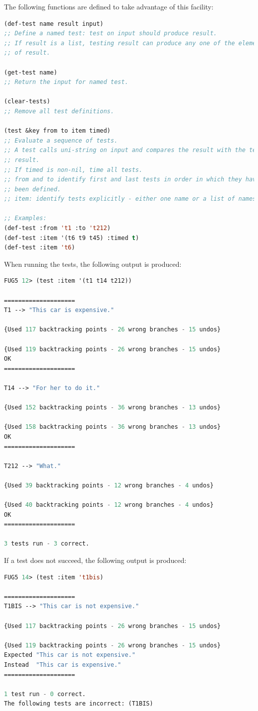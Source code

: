 \documentclass[10pt,a4paper]{report}
\begin{document}
The following functions are defined to take advantage of this facility:

\begin{lstlisting}[language=Lisp]
(def-test name result input) 
;; Define a named test: test on input should produce result. 
;; If result is a list, testing result can produce any one of the elements
;; of result.

(get-test name)
;; Return the input for named test.

(clear-tests)
;; Remove all test definitions.

(test &key from to item timed)
;; Evaluate a sequence of tests.
;; A test calls uni-string on input and compares the result with the test's
;; result. 
;; If timed is non-nil, time all tests.
;; from and to identify first and last tests in order in which they have
;; been defined.
;; item: identify tests explicitly - either one name or a list of names.

;; Examples:
(def-test :from 't1 :to 't212)
(def-test :item '(t6 t9 t45) :timed t)
(def-test :item 't6)
\end{lstlisting}

When running the tests, the following output is produced:

\begin{lstlisting}[language=Lisp]
FUG5 12> (test :item '(t1 t14 t212))

====================
T1 --> "This car is expensive."

{Used 117 backtracking points - 26 wrong branches - 15 undos}

{Used 119 backtracking points - 26 wrong branches - 15 undos}
OK
====================

T14 --> "For her to do it."

{Used 152 backtracking points - 36 wrong branches - 13 undos}

{Used 158 backtracking points - 36 wrong branches - 13 undos}
OK
====================

T212 --> "What."

{Used 39 backtracking points - 12 wrong branches - 4 undos}

{Used 40 backtracking points - 12 wrong branches - 4 undos}
OK
====================

3 tests run - 3 correct.
\end{lstlisting}

If a test does not succeed, the following output is produced:

\begin{lstlisting}[language=Lisp]
FUG5 14> (test :item 't1bis)

====================
T1BIS --> "This car is not expensive."

{Used 117 backtracking points - 26 wrong branches - 15 undos}

{Used 119 backtracking points - 26 wrong branches - 15 undos}
Expected "This car is not expensive."
Instead  "This car is expensive."
====================

1 test run - 0 correct.
The following tests are incorrect: (T1BIS)
\end{lstlisting}
\end{document}
